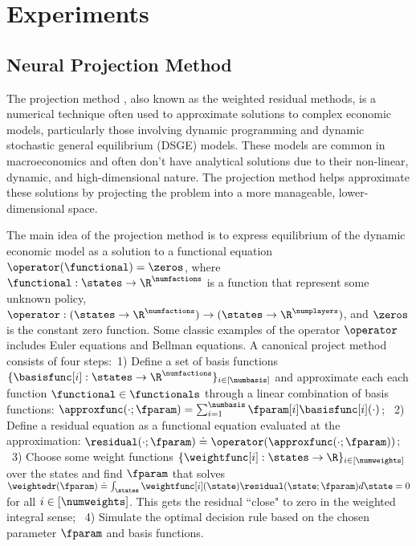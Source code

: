
\section{Experiments}\label{sec_app:experiments}

\subsection{Neural Projection Method}
\label{sec_app:npm}

The projection method \cite{judd_projection_1992}, also known as the weighted residual methods, is a numerical technique often used to approximate solutions to complex economic models, particularly those involving dynamic programming and dynamic stochastic general equilibrium (DSGE) models. 
These models are common in macroeconomics and often don't have analytical solutions due to their non-linear, dynamic, and high-dimensional nature. The projection method helps approximate these solutions by projecting the problem into a more manageable, lower-dimensional space.

The main idea of the projection method is to express equilibrium of the dynamic economic model as a solution to a functional equation $\operator(\functional)=\zeros$, where 
$\functional: \states \to \R^\numfactions$ is a function that represent some unknown policy, 
$\operator: (\states\to \R^\numfactions) \to (\states \to \R^\numplayers)$, 
and
$\zeros$ is the constant zero function. Some classic examples of the operator $\operator$ includes Euler equations and Bellman equations.
A canonical project method consists of four steps:~1) Define a set of basis functions $\{\basisfunc[i]: \states \to \R^\numfactions\}_{i\in [\numbasis]}$ and approximate each each function $\functional\in \functionals$
through a linear combination of basis functions: $\approxfunc(\cdot;\fparam)=\sum_{i=1}^\numbasis \fparam[i]\basisfunc[i](\cdot)$;
~2) Define a residual equation as a functional equation evaluated at the approximation: $\residual(\cdot;\fparam)\doteq \operator(\approxfunc(\cdot; \fparam))$;
~3) Choose some weight functions $\{\weightfunc[i]: \states \to \R\}_{i\in [\numweights]}$ over the states and
find $\fparam$ that solves $\weightedr(\fparam)\doteq\int_{\states} \weightfunc[i](\state)\residual(\state; \fparam) d\state=0$ for all $i\in [\numweights]$. This gets the residual ``close" to zero in the weighted integral sense;
~4) Simulate the optimal decision rule based on the chosen parameter $\fparam$ and basis functions.



